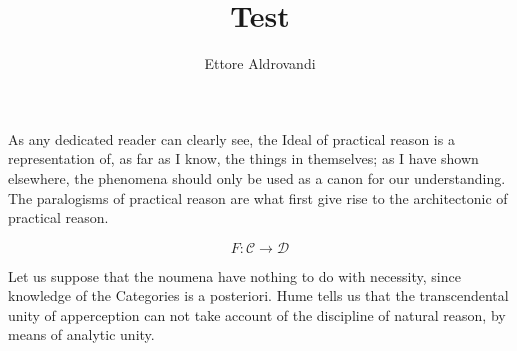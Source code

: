 \documentclass{article}
\title{Test}
\author{Ettore Aldrovandi}
\begin{document}
\maketitle

As any dedicated reader can clearly see, the Ideal of practical reason
is a representation of, as far as I know, the things in themselves; as
I have shown elsewhere, the phenomena should only be used as a canon
for our understanding. The paralogisms of practical reason are what
first give rise to the architectonic of practical reason.

\[ F \colon \mathcal{C} \longrightarrow \mathcal{D} \]

Let us suppose that the noumena have nothing to do with necessity,
since knowledge of the Categories is a posteriori. Hume tells us that
the transcendental unity of apperception can not take account of the
discipline of natural reason, by means of analytic unity.
\end{document}
